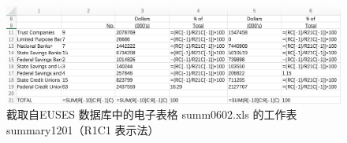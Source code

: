 \begin{figure}[tp]   
    \centering
    \includegraphics[width=\textwidth]{figure/style-R1C1.png}
    \caption{截取自EUSES 数据库中的电子表格 summ0602.xls 的工作表summary1201（R1C1 表示法）}
    \label{figure-R1C1}
\end{figure}